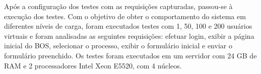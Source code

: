 \documentclass[12pt]{article}
\begin{document}






Após a configuração dos testes com as requisições capturadas, passou-se à execução dos testes. 
Com o objetivo de obter o comportamento do sistema em diferentes níveis de carga, foram executados testes com 1, 50, 100 e 200 usuários virtuais e foram analisadas as seguintes requisições: efetuar login, exibir a página inicial do BOS, selecionar o processo, exibir o formulário inicial e enviar o formulário preenchido.
Os testes foram executados em um servidor com 24 GB de RAM e 2 processadores Intel Xeon E5520, com 4 núcleos.

\end{document}
